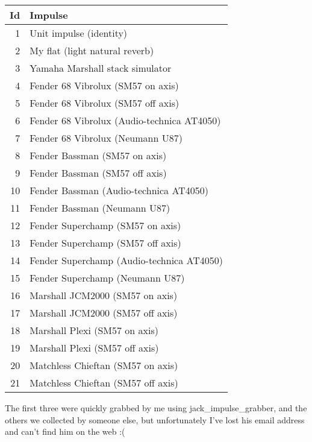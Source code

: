 \documentclass[11pt]{article}
\begin{document}
    \begin{tabular}{|r|l|}
    \hline
    Id & Impulse \\
    \hline \hline
    1 & Unit impulse (identity) \\
    2 & My flat (light natural reverb) \\
    3 & Yamaha Marshall stack simulator \\
    4 & Fender 68 Vibrolux (SM57 on axis) \\
    5 & Fender 68 Vibrolux (SM57 off axis) \\
    6 & Fender 68 Vibrolux (Audio-technica AT4050) \\
    7 & Fender 68 Vibrolux (Neumann U87) \\
    8 & Fender Bassman (SM57 on axis) \\
    9 & Fender Bassman (SM57 off axis) \\
    10 & Fender Bassman (Audio-technica AT4050) \\
    11 & Fender Bassman (Neumann U87) \\
    12 & Fender Superchamp (SM57 on axis) \\
    13 & Fender Superchamp (SM57 off axis) \\
    14 & Fender Superchamp (Audio-technica AT4050) \\
    15 & Fender Superchamp (Neumann U87) \\
    16 & Marshall JCM2000 (SM57 on axis) \\
    17 & Marshall JCM2000 (SM57 off axis) \\
    18 & Marshall Plexi (SM57 on axis) \\
    19 & Marshall Plexi (SM57 off axis) \\
    20 & Matchless Chieftan (SM57 on axis) \\
    21 & Matchless Chieftan (SM57 off axis) \\
    \hline
    \end{tabular}

    The first three were quickly grabbed by me using jack\_impulse\_grabber, and the others we collected by someone else, but unfortunately I've lost his email address and can't find him on the web :(
\end{document}
